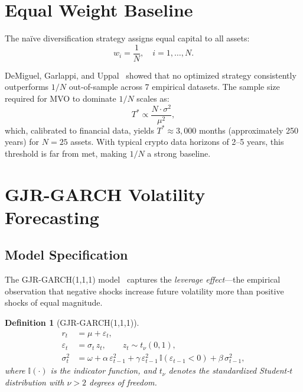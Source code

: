 \documentclass[12pt,a4paper]{article}
\newtheorem{definition}{Definition}[section]
\begin{document}
\section{Equal Weight Baseline}
\label{sec:equal-weight}

The na\"ive diversification strategy assigns equal capital to all assets:
\begin{equation}
    w_i = \frac{1}{N}, \quad i = 1, \ldots, N.
    \label{eq:equal-weight}
\end{equation}

DeMiguel, Garlappi, and Uppal~\cite{demiguel2009} showed that no optimized strategy consistently outperforms $1/N$ out-of-sample across 7 empirical datasets. The sample size required for MVO to dominate $1/N$ scales as:
\begin{equation}
    T^* \propto \frac{N \cdot \sigma^2}{\mu^2},
\end{equation}
which, calibrated to financial data, yields $T^* \approx 3{,}000$ months (approximately 250 years) for $N = 25$ assets. With typical crypto data horizons of 2--5 years, this threshold is far from met, making $1/N$ a strong baseline.

\section{GJR-GARCH Volatility Forecasting}
\label{sec:garch}

\subsection{Model Specification}

The GJR-GARCH(1,1,1) model~\cite{glosten1993} captures the \emph{leverage effect}---the empirical observation that negative shocks increase future volatility more than positive shocks of equal magnitude.

\begin{definition}[GJR-GARCH(1,1,1)]
\begin{align}
    r_t &= \mu + \varepsilon_t, \label{eq:garch-return} \\
    \varepsilon_t &= \sigma_t\, z_t, \qquad z_t \sim t_\nu(0,1), \label{eq:garch-innovation} \\
    \sigma_t^2 &= \omega + \alpha\,\varepsilon_{t-1}^2
        + \gamma\,\varepsilon_{t-1}^2\,\mathbb{I}(\varepsilon_{t-1} < 0)
        + \beta\,\sigma_{t-1}^2,
    \label{eq:garch-variance}
\end{align}
where $\mathbb{I}(\cdot)$ is the indicator function, and $t_\nu$ denotes the standardized Student-$t$ distribution with $\nu > 2$ degrees of freedom.
\end{definition}
\end{document}
